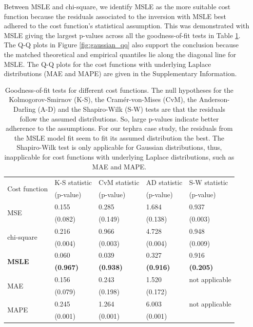 \documentclass[a4paper,fleqn]{cas-sc}
\begin{document}
Between MSLE and chi-square, we identify MSLE as the more suitable cost function because the residuals associated to the inversion with MSLE best adhered to the cost function's statistical assumption. This was demonstrated with MSLE giving the largest p-values across all the goodness-of-fit tests in Table \ref{tab:GOF_loss}. The Q-Q plots in Figure \ref{fig:gaussian_qq} also support the conclusion because the matched theoretical and empirical quantiles lie along the diagonal line for MSLE. The Q-Q plots for the cost functions with underlying Laplace distributions (MAE and MAPE) are given in the Supplementary Information.

    \begin{table}[tbp]
    \caption{Goodness-of-fit tests for different cost functions. The null hypotheses for the Kolmogorov-Smirnov (K-S), the Cram{\'e}r-von-Mises (CvM), the Anderson-Darling (A-D) and the Shapiro-Wilk (S-W) tests are that the residuals follow the assumed distributions. So, large p-values indicate better adherence to the assumptions. For our tephra case study, the residuals from the MSLE model fit seem to fit its assumed distribution the best. The Shapiro-Wilk test is only applicable for Gaussian distributions, thus, inapplicable for cost functions with underlying Laplace distributions, such as MAE and MAPE.}
    \begin{tabular}{lllll}
    \hline
    \multirow{2}{*}{Cost function} &  K-S statistic & CvM statistic & AD statistic & S-W statistic \\
    & (p-value) & (p-value) & (p-value) & (p-value) \\
    \hline
    \multirow{2}{*}{MSE}  & 0.155 & 0.285 & 1.684	& 0.937 \\
     & (0.082) & (0.149) & (0.138) & (0.003) \\
    \hline
    \multirow{2}{*}{chi-square}    & 0.216 & 0.966 & 4.728 & 0.948 \\
     & (0.004) & (0.003) & (0.004) & (0.009) \\
    \hline
    \multirow{2}{*}{\textbf{MSLE}}  & 0.060 & 0.039 & 0.327 & 0.916 \\
    & \textbf{(0.967)} & \textbf{(0.938)} & \textbf{(0.916)} & \textbf{(0.205)} \\
    \hline
    \multirow{2}{*}{MAE}  &   0.156 & 0.243 & 1.520 & not applicable \\
     & (0.079) & (0.198) & (0.172) &  \\   
    \hline
    \multirow{2}{*}{MAPE}  & 0.245 & 1.264 & 6.003 & not applicable \\
    & (0.001) & (0.001) & (0.001) &  \\ 
    \hline
    \end{tabular}
    \vspace{2mm}
    \label{tab:GOF_loss}
    \end{table}
\end{document}
